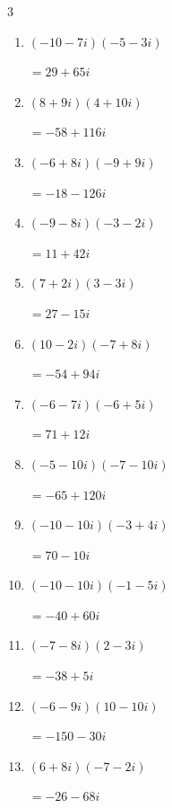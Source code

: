 \begin{multicols}{3}
\begin{enumerate}
  \item $\displaystyle (-10-7i)(-5-3i)$

        $\displaystyle =29+65i$

  \item $\displaystyle (8+9i)(4+10i)$

        $\displaystyle =-58+116i$

  \item $\displaystyle (-6+8i)(-9+9i)$

        $\displaystyle =-18-126i$

  \item $\displaystyle (-9-8i)(-3-2i)$

        $\displaystyle =11+42i$

  \item $\displaystyle (7+2i)(3-3i)$

        $\displaystyle =27-15i$

  \item $\displaystyle (10-2i)(-7+8i)$

        $\displaystyle =-54+94i$

  \item $\displaystyle (-6-7i)(-6+5i)$

        $\displaystyle =71+12i$

  \item $\displaystyle (-5-10i)(-7-10i)$

        $\displaystyle =-65+120i$

  \item $\displaystyle (-10-10i)(-3+4i)$

        $\displaystyle =70-10i$

  \item $\displaystyle (-10-10i)(-1-5i)$

        $\displaystyle =-40+60i$

\columnbreak %

\resetques

  \item $\displaystyle (-7-8i)(2-3i)$

        $\displaystyle =-38+5i$

  \item $\displaystyle (-6-9i)(10-10i)$

        $\displaystyle =-150-30i$

  \item $\displaystyle (6+8i)(-7-2i)$

        $\displaystyle =-26-68i$


\end{enumerate}
\end{multicols}
